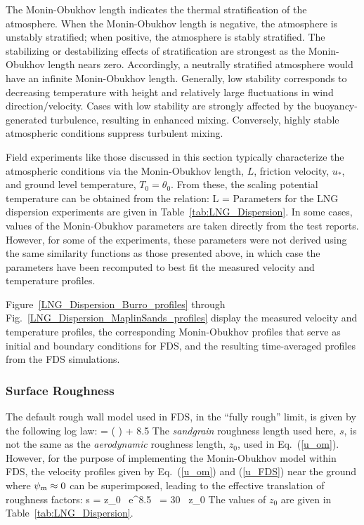 The Monin-Obukhov length indicates the thermal stratification of the atmosphere.  When the Monin-Obukhov length is negative, the atmosphere is unstably stratified; when positive, the atmosphere is stably stratified.  The stabilizing or destabilizing effects of stratification are strongest as the Monin-Obukhov length nears zero.  Accordingly, a neutrally stratified atmosphere would have an infinite Monin-Obukhov length. Generally, low stability corresponds to decreasing temperature with height and relatively large fluctuations in wind direction/velocity. Cases with low stability are strongly affected by the buoyancy-generated turbulence, resulting in enhanced mixing.  Conversely, highly stable atmospheric conditions suppress turbulent mixing.

Field experiments like those discussed in this section typically characterize the atmospheric conditions via the Monin-Obukhov length, $L$, friction velocity, $u_*$, and ground level temperature, $T_0=\theta_0$. From these, the scaling potential temperature can be obtained from the relation:
\be
   L = 
\ee
Parameters for the LNG dispersion experiments are given in Table~\ref{tab:LNG_Dispersion}. In some cases, values of the Monin-Obukhov parameters are taken directly from the test reports. However, for some of the experiments, these parameters were not derived using the same similarity functions as those presented above, in which case the parameters have been recomputed to best fit the measured velocity and temperature profiles.

Figure~\ref{LNG_Dispersion_Burro_profiles} through Fig.~\ref{LNG_Dispersion_MaplinSands_profiles} display the measured velocity and temperature profiles, the corresponding Monin-Obukhov profiles that serve as initial and boundary conditions for FDS, and the resulting time-averaged profiles from the FDS simulations.

\subsubsection{Surface Roughness}

The default rough wall model used in FDS, in the ``fully rough'' limit, is given by the following log law:
\be
    =  \ln \left(  \right) + 8.5  \label{u_FDS}
\ee
The \emph{sandgrain} roughness length used here, $s$, is not the same as the \emph{aerodynamic} roughness length, $z_0$, used in Eq.~(\ref{u_om}). However, for the purpose of implementing the Monin-Obukhov model within FDS, the velocity profiles given by Eq.~(\ref{u_om}) and (\ref{u_FDS}) near the ground where $\psi_{\rm m} \approx 0$ can be superimposed, leading to the effective translation of roughness factors:
\be
   s = z_0 \, {\rm e}^{8.5 \, \kappa} = 30 \, z_0
\ee
The values of $z_0$ are given in Table~\ref{tab:LNG_Dispersion}.

